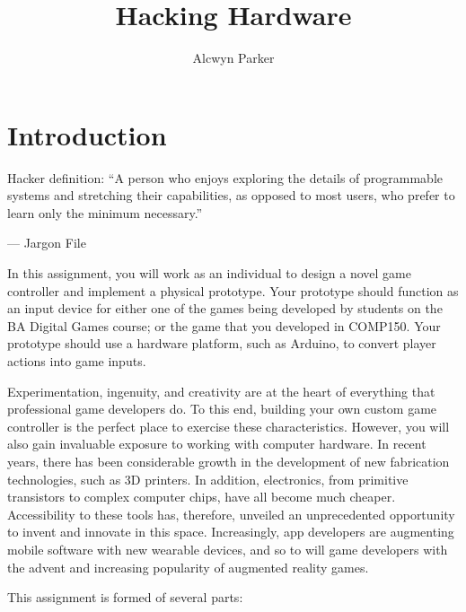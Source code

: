 \documentclass{../fal_assignment}
\title{Hacking Hardware}
\author{Alcwyn Parker}
\begin{document}
\maketitle

\section*{Introduction}

\begin{marginquote}
Hacker definition: ``A person who enjoys exploring the details of programmable systems and stretching their capabilities, as opposed to most users, who prefer to learn only the minimum necessary.''

--- Jargon File

\end{marginquote}

In this assignment, you will work as an individual to design a novel game controller and implement a physical prototype. Your prototype should function as an input device for either one of the games being developed by students on the BA Digital Games course; or the game that you developed in COMP150. Your prototype should use a hardware platform, such as Arduino, to convert player actions into game inputs. 

Experimentation, ingenuity, and creativity are at the heart of everything that professional game developers do. To this end, building your own custom game controller is the perfect place to exercise these characteristics. However, you will also gain invaluable exposure to working with computer hardware. In recent years, there has been considerable growth in the development of new fabrication technologies, such as 3D printers. In addition, electronics, from primitive transistors to complex computer chips, have all become much cheaper. Accessibility to these tools has, therefore, unveiled an unprecedented opportunity to invent and innovate in this space. Increasingly, app developers are augmenting mobile software with new wearable devices, and so to will game developers with the advent and increasing popularity of augmented reality games.

This assignment is formed of several parts:
\end{document}
